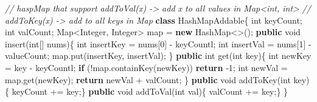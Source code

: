 \documentclass[
]{article}
\newenvironment{Shaded}{}{}
\newcommand{\BuiltInTok}[1]{#1}
\newcommand{\CommentTok}[1]{\textcolor[rgb]{0.38,0.63,0.69}{\textit{#1}}}
\newcommand{\ControlFlowTok}[1]{\textcolor[rgb]{0.00,0.44,0.13}{\textbf{#1}}}
\newcommand{\DataTypeTok}[1]{\textcolor[rgb]{0.56,0.13,0.00}{#1}}
\newcommand{\DecValTok}[1]{\textcolor[rgb]{0.25,0.63,0.44}{#1}}
\newcommand{\FunctionTok}[1]{\textcolor[rgb]{0.02,0.16,0.49}{#1}}
\newcommand{\KeywordTok}[1]{\textcolor[rgb]{0.00,0.44,0.13}{\textbf{#1}}}
\newcommand{\NormalTok}[1]{#1}
\newcommand{\OperatorTok}[1]{\textcolor[rgb]{0.40,0.40,0.40}{#1}}
\begin{document}
\begin{Shaded}
\begin{Highlighting}[]
\CommentTok{// haspMap that support addToVal(x) {-}\textgreater{} add x to all values in Map\textless{}int, int\textgreater{}}
\CommentTok{// addToKey(x) {-}\textgreater{} add to all keys in Map}
\KeywordTok{class}\NormalTok{ HashMapAddable}\OperatorTok{\{}
  \DataTypeTok{int}\NormalTok{ keyCount}\OperatorTok{;}
  \DataTypeTok{int}\NormalTok{ valCount}\OperatorTok{;}
  \BuiltInTok{Map}\OperatorTok{\textless{}}\BuiltInTok{Integer}\OperatorTok{,} \BuiltInTok{Integer}\OperatorTok{\textgreater{}}\NormalTok{ map }\OperatorTok{=} \KeywordTok{new} \BuiltInTok{HashMap}\OperatorTok{\textless{}\textgreater{}();}
  \KeywordTok{public} \DataTypeTok{void} \FunctionTok{insert}\OperatorTok{(}\DataTypeTok{int}\OperatorTok{[]}\NormalTok{ nums}\OperatorTok{)\{}
    \DataTypeTok{int}\NormalTok{ insertKey }\OperatorTok{=}\NormalTok{ nums}\OperatorTok{[}\DecValTok{0}\OperatorTok{]} \OperatorTok{{-}}\NormalTok{ keyCountl}\OperatorTok{;}
    \DataTypeTok{int}\NormalTok{ insertVal }\OperatorTok{=}\NormalTok{ nums}\OperatorTok{[}\DecValTok{1}\OperatorTok{]} \OperatorTok{{-}}\NormalTok{ valueCount}\OperatorTok{;}
\NormalTok{    map}\OperatorTok{.}\FunctionTok{put}\OperatorTok{(}\NormalTok{insertKey}\OperatorTok{,}\NormalTok{ insertVal}\OperatorTok{);}
  \OperatorTok{\}}
  \KeywordTok{public} \DataTypeTok{int} \FunctionTok{get}\OperatorTok{(}\DataTypeTok{int}\NormalTok{ key}\OperatorTok{)\{}
    \DataTypeTok{int}\NormalTok{ newKey }\OperatorTok{=}\NormalTok{ key }\OperatorTok{{-}}\NormalTok{ keyCountl}\OperatorTok{;}
    \ControlFlowTok{if} \OperatorTok{(!}\NormalTok{map}\OperatorTok{.}\FunctionTok{containKey}\OperatorTok{(}\NormalTok{newKey}\OperatorTok{))} \ControlFlowTok{return} \OperatorTok{{-}}\DecValTok{1}\OperatorTok{;}
    \DataTypeTok{int}\NormalTok{ newVal }\OperatorTok{=}\NormalTok{ map}\OperatorTok{.}\FunctionTok{get}\OperatorTok{(}\NormalTok{newKey}\OperatorTok{);}
    \ControlFlowTok{return}\NormalTok{ newVal }\OperatorTok{+}\NormalTok{ valCount}\OperatorTok{;}
  \OperatorTok{\}}
  \KeywordTok{public} \DataTypeTok{void} \FunctionTok{addToKey}\OperatorTok{(}\DataTypeTok{int}\NormalTok{ key}\OperatorTok{)\{}\NormalTok{ keyCount }\OperatorTok{+=}\NormalTok{ key}\OperatorTok{;\}}
  \KeywordTok{public} \DataTypeTok{void} \FunctionTok{addToVal}\OperatorTok{(}\DataTypeTok{int}\NormalTok{ val}\OperatorTok{)\{}\NormalTok{ valCount }\OperatorTok{+=}\NormalTok{ key}\OperatorTok{;\}}
\OperatorTok{\}}
\end{Highlighting}
\end{Shaded}
\end{document}

